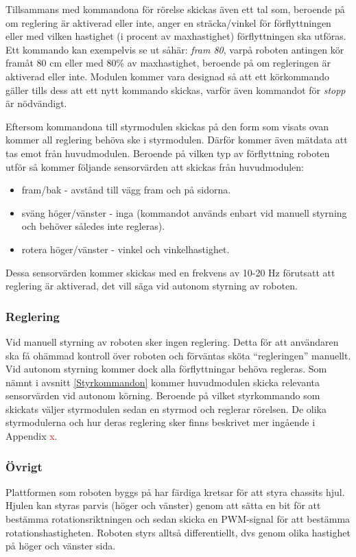 \documentclass[11pt]{article}
\begin{document}
\begin{flushleft}
Tillsammans med kommandona för rörelse skickas även ett tal som, beroende på om reglering är aktiverad eller inte, anger en sträcka/vinkel för förflyttningen eller med vilken hastighet (i procent av maxhastighet) förflyttningen ska utföras. Ett kommando kan exempelvis se ut såhär: \textit{fram 80}, varpå roboten antingen kör framåt 80 cm eller med 80\% av maxhastighet, beroende på om regleringen är aktiverad eller inte. Modulen kommer vara designad så att ett körkommando gäller tills dess att ett nytt kommando skickas, varför även kommandot för \textit{stopp} är nödvändigt.

Eftersom kommandona till styrmodulen skickas på den form som visats ovan kommer all reglering behöva ske i styrmodulen. Därför kommer även mätdata att tas emot från huvudmodulen. Beroende på vilken typ av förflyttning roboten utför så kommer följande sensorvärden att skickas från huvudmodulen:
\begin{itemize}
	\item fram/bak - avstånd till vägg fram och på sidorna.
	\item sväng höger/vänster - inga (kommandot används enbart vid manuell styrning och behöver således inte regleras).
	\item rotera höger/vänster - vinkel och vinkelhastighet.
\end{itemize}
Dessa sensorvärden kommer skickas med en frekvens av 10-20 Hz förutsatt att reglering är aktiverad, det vill säga vid autonom styrning av roboten.

\subsubsection{Reglering}
Vid manuell styrning av roboten sker ingen reglering. Detta för att användaren ska få ohämmad kontroll över roboten och förväntas sköta ``regleringen'' manuellt. Vid autonom styrning kommer dock alla förflyttningar behöva regleras. Som nämnt i avsnitt \ref{Styrkommandon} kommer huvudmodulen skicka relevanta sensorvärden vid autonom körning. Beroende på vilket styrkommando som skickats väljer styrmodulen sedan en styrmod och reglerar rörelsen. De olika styrmodulerna och hur deras reglering sker finns beskrivet mer ingående i Appendix \textcolor{red}{x}.

\subsubsection{Övrigt}
Plattformen som roboten byggs på har färdiga kretsar för att styra chassits hjul. Hjulen kan styras parvis (höger och vänster) genom att sätta en bit för att bestämma rotationsriktningen och sedan skicka en PWM-signal för att bestämma rotationshastigheten. Roboten styrs alltså differentiellt, dvs genom olika hastighet på höger och vänster sida.


\end{flushleft}
\end{document}
